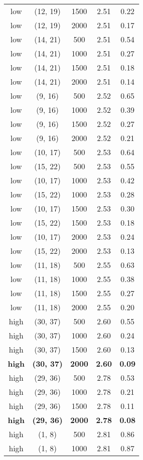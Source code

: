 \begin{tabular}{c c c c c}
low & (12, 19) &  1500 & 2.51 & 0.22 \\
low & (12, 19) &  2000 & 2.51 & 0.17 \\
low & (14, 21) &  500 & 2.51 & 0.54 \\
low & (14, 21) &  1000 & 2.51 & 0.27 \\
low & (14, 21) &  1500 & 2.51 & 0.18 \\
low & (14, 21) &  2000 & 2.51 & 0.14 \\
low & (9, 16) &  500 & 2.52 & 0.65 \\
low & (9, 16) &  1000 & 2.52 & 0.39 \\
low & (9, 16) &  1500 & 2.52 & 0.27 \\
low & (9, 16) &  2000 & 2.52 & 0.21 \\
low & (10, 17) &  500 & 2.53 & 0.64 \\
low & (15, 22) &  500 & 2.53 & 0.55 \\
low & (10, 17) &  1000 & 2.53 & 0.42 \\
low & (15, 22) &  1000 & 2.53 & 0.28 \\
low & (10, 17) &  1500 & 2.53 & 0.30 \\
low & (15, 22) &  1500 & 2.53 & 0.18 \\
low & (10, 17) &  2000 & 2.53 & 0.24 \\
low & (15, 22) &  2000 & 2.53 & 0.13 \\
low & (11, 18) &  500 & 2.55 & 0.63 \\
low & (11, 18) &  1000 & 2.55 & 0.38 \\
low & (11, 18) &  1500 & 2.55 & 0.27 \\
low & (11, 18) &  2000 & 2.55 & 0.20 \\
high & (30, 37) &  500 & 2.60 & 0.55 \\
high & (30, 37) &  1000 & 2.60 & 0.24 \\
high & (30, 37) &  1500 & 2.60 & 0.13 \\
\textbf{high} & \textbf{(30, 37)} & \textbf{ 2000} & \textbf{2.60} & \textbf{0.09} \\
high & (29, 36) &  500 & 2.78 & 0.53 \\
high & (29, 36) &  1000 & 2.78 & 0.21 \\
high & (29, 36) &  1500 & 2.78 & 0.11 \\
\textbf{high} & \textbf{(29, 36)} & \textbf{ 2000} & \textbf{2.78} & \textbf{0.08} \\
high & (1, 8) &  500 & 2.81 & 0.86 \\
high & (1, 8) &  1000 & 2.81 & 0.87 \\

\end{tabular}
